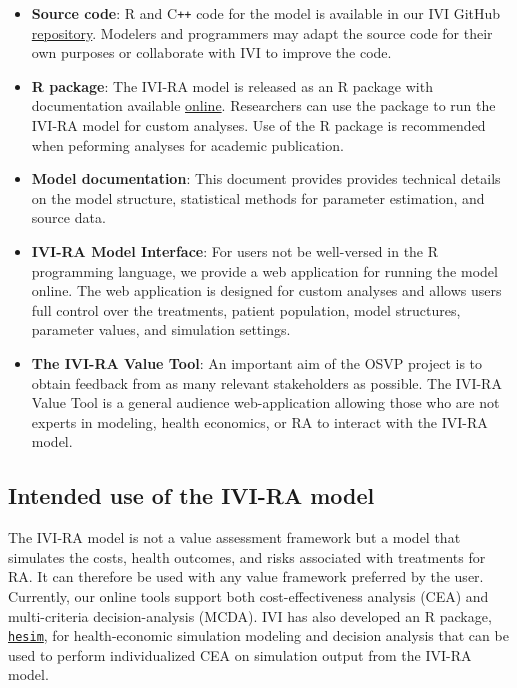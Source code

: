 \documentclass[11pt,final,fleqn]{article}\usepackage[]{graphicx}\usepackage[]{color}
\theoremstyle{plain}
\newcommand\CPP{{C\texttt{++}}}
\newcommand\R{{\textsf{R}}}
\newcommand{\code}[1]{\texttt{#1}}
\begin{document}
\begin{itemize}
\item \textbf{Source code}: {\R{}} and \CPP{} code for the model is available in our IVI GitHub \href{https://github.com/InnovationValueInitiative/IVI-RA}{repository}. Modelers and programmers may adapt the source code for their own purposes or collaborate with IVI to improve the code. 
\item \textbf{{\R{}} package}: The IVI-RA model is released as an \R{} package with documentation available \href{https://innovationvalueinitiative.github.io/IVI-RA/index.html}{online}. Researchers can use the package to run the IVI-RA model for custom analyses. Use of the {\R{}} package is recommended when peforming analyses for academic publication.
\item \textbf{Model documentation}: This document provides provides technical details on the model structure, statistical methods for parameter estimation, and source data.
\item \textbf{IVI-RA Model Interface}: For users not be well-versed in the {\R{}} programming language, we provide a web application for running the model online. The web application is designed for custom analyses and allows users full control over the treatments, patient population, model structures, parameter values, and simulation settings.  
\item \textbf{The IVI-RA Value Tool}: An important aim of the OSVP project is to obtain feedback from as many relevant stakeholders as possible. The IVI-RA Value Tool is a general audience web-application allowing those who are not experts in modeling, health economics, or RA to interact with the IVI-RA model. 
\end{itemize}

\subsection*{Intended use of the IVI-RA model}
The IVI-RA model is not a value assessment framework but a model that simulates the costs, health outcomes, and risks associated with treatments for RA. It can therefore be used with any value framework preferred by the user. Currently, our online tools support both cost-effectiveness analysis (CEA) and multi-criteria decision-analysis (MCDA). IVI has also developed an R package, \code{\href{https://innovationvalueinitiative.github.io/hesim/}{hesim}}, for health-economic simulation modeling and decision analysis that can be used to perform individualized CEA \citep{basu2007value, ioannidis2011individualized, espinoza2014value} on simulation output from the IVI-RA model. 
\end{document}
